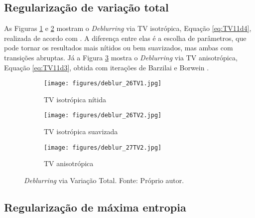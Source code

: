 \subsection{Regularização de variação total}

 As Figuras \ref{fig:deconvtva} e  \ref{fig:deconvtvb} mostram o \textit{Deblurring} via TV isotrópica, Equação \eqref{eq:TV11d4},  realizada de acordo com \cite{Chan2011}. A diferença entre elas é a escolha de parâmetros, que pode tornar os resultados mais nítidos ou bem suavizados, mas ambas com transições abruptas. Já a Figura \ref{fig:deconvtvc} mostra o \textit{Deblurring} via TV anisotrópica, Equação \eqref{eq:TV11d3}, obtida com iterações de Barzilai e Borwein \cite[págs. 90-2]{Mueller2012}. 

\begin{figure}[H]
     \centering
     \begin{subfigure}[b]{0.32\textwidth}
         \centering
         \texttt{[image: figures/deblur\_26TV1.jpg]}
         \caption{TV isotrópica nítida} 
         \label{fig:deconvtva}
     \end{subfigure}
     \hfill
     \begin{subfigure}[b]{0.32\textwidth}
         \centering
                  \texttt{[image: figures/deblur\_26TV2.jpg]}
         \caption{TV isotrópica suavizada} 
         \label{fig:deconvtvb}
     \end{subfigure}
          \hfill
     \begin{subfigure}[b]{0.32\textwidth}
         \centering
                  \texttt{[image: figures/deblur\_27TV2.jpg]}
         \caption{TV anisotrópica} 
         \label{fig:deconvtvc}
     \end{subfigure}
\caption[\textit{Deblurring} via Variação Total.]{\textit{Deblurring} via Variação Total. Fonte: Próprio autor.}
\label{fig:deconvtv}
\end{figure}



\subsection{Regularização de máxima entropia}

